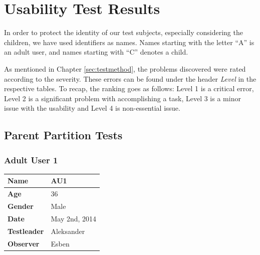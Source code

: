 \section{Usability Test Results}
\label{sec:usabilityresults}
In order to protect the identity of our test subjects, especially considering the children, we have used identifiers as names. Names starting with the letter ``A'' is an adult user, and names starting with ``C'' denotes a child.

As mentioned in Chapter \ref{sec:testmethod}, the problems discovered were rated according to the severity. These errors can be found under the header \emph{Level} in the respective tables. To recap, the ranking goes as follows: Level 1 is a critical error, Level 2 is a significant problem with accomplishing a task, Level 3 is a minor issue with the usability and Level 4 is non-essential issue. 
  

\subsection{Parent Partition Tests}

\subsubsection{Adult User 1}
\begin{table}[H]
\centering
\begin{tabular}{|p{4.0cm} | p{4.0cm} |}
	\hline
	\textbf{Name} & AU1\\
	\hline
	\textbf{Age} & 36 \\
	\hline
	\textbf{Gender} & Male \\
 	\hline 
	\textbf{Date} & May 2nd, 2014 \\
	\hline
	\textbf{Testleader} & Aleksander\\
	\hline
	\textbf{Observer} & Esben\\
	\hline	
\end{tabular}
\end{table}

